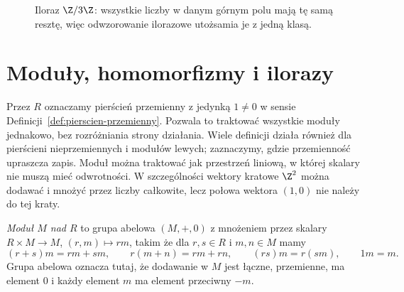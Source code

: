 \begin{figure}[htbp]
\centering
{}
\caption{Iloraz $\Z/3\Z$: wszystkie liczby w danym
górnym polu mają tę samą resztę, więc odwzorowanie ilorazowe
utożsamia je z jedną klasą.}
\label{fig:reszty-modulo-3-5}
\end{figure}

\section{Moduły, homomorfizmy i ilorazy}
\label{sec:moduly}

Przez $R$ oznaczamy pierścień przemienny z jedynką
$1\ne0$ w sensie Definicji~\ref{def:pierscien-przemienny}.
Pozwala to traktować wszystkie moduły
jednakowo, bez rozróżniania strony działania.
Wiele definicji działa również dla pierścieni
nieprzemiennych i modułów lewych; zaznaczymy,
gdzie przemienność upraszcza zapis.
Moduł można traktować jak przestrzeń liniową, w której
skalary nie muszą mieć odwrotności. W szczególności
wektory kratowe $\Z^2$ można dodawać i mnożyć przez
liczby całkowite, lecz połowa wektora $(1,0)$
nie należy do tej kraty.

\begin{definicja}
\label{def:modul}
\emph{Moduł $M$ nad $R$} to grupa abelowa
$(M,+,0)$ z mnożeniem przez skalary
$R\times M\to M$, $(r,m)\mapsto rm$, takim że
dla $r,s\in R$ i $m,n\in M$ mamy
\[
 (r+s)m=rm+sm,\qquad r(m+n)=rm+rn,\qquad
 (rs)m=r(sm),\qquad 1m=m.
\]
Grupa abelowa oznacza tutaj, że dodawanie w $M$
jest łączne, przemienne, ma element $0$ i każdy
element $m$ ma element przeciwny $-m$.
\end{definicja}

